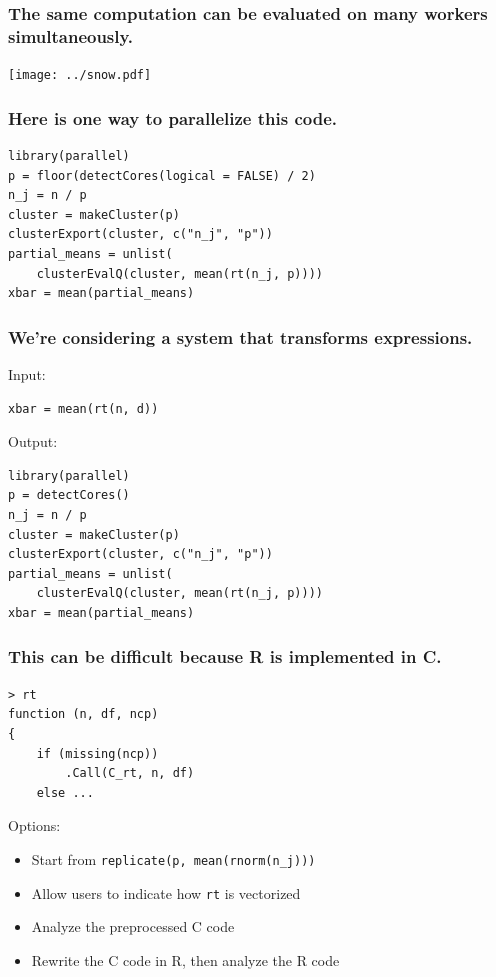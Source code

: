 \documentclass{beamer}
\begin{document}
\begin{frame}

    \frametitle{The same computation can be evaluated on many workers
    simultaneously.}

\centerline{\texttt{[image: ../snow.pdf]}}

\end{frame}
\begin{frame}[fragile]

    \frametitle{Here is one way to parallelize this code.}

\begin{verbatim}
library(parallel)
p = floor(detectCores(logical = FALSE) / 2)
n_j = n / p
cluster = makeCluster(p)
clusterExport(cluster, c("n_j", "p"))
partial_means = unlist(
    clusterEvalQ(cluster, mean(rt(n_j, p))))
xbar = mean(partial_means)
\end{verbatim}

\end{frame}
\begin{frame}[fragile]

    \frametitle{We're considering a system that transforms expressions.}

    Input:

\begin{verbatim}
xbar = mean(rt(n, d))
\end{verbatim}

    Output:

\begin{verbatim}
library(parallel)
p = detectCores()
n_j = n / p
cluster = makeCluster(p)
clusterExport(cluster, c("n_j", "p"))
partial_means = unlist(
    clusterEvalQ(cluster, mean(rt(n_j, p))))
xbar = mean(partial_means)
\end{verbatim}

\end{frame}
\begin{frame}[fragile]

    \frametitle{This can be difficult because R is implemented in C.}

\begin{verbatim}
> rt
function (n, df, ncp)
{
    if (missing(ncp))
        .Call(C_rt, n, df)
    else ...
\end{verbatim}

\pause

    Options:

    \begin{itemize}
        \item Start from \texttt{replicate(p, mean(rnorm(n\_j)))}
        \item Allow users to indicate how \texttt{rt} is vectorized
        \item Analyze the preprocessed C code
        \item Rewrite the C code in R, then analyze the R code
    \end{itemize}

\end{frame}
\end{document}
